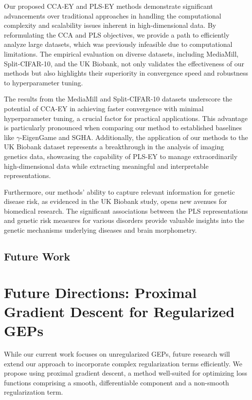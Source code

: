 Our proposed CCA-EY and PLS-EY methods demonstrate significant advancements over traditional approaches in handling the computational complexity and scalability issues inherent in high-dimensional data.
By reformulating the CCA and PLS objectives, we provide a path to efficiently analyze large datasets, which was previously infeasible due to computational limitations.
The empirical evaluation on diverse datasets, including MediaMill, Split-CIFAR-10, and the UK Biobank, not only validates the effectiveness of our methods but also highlights their superiority in convergence speed and robustness to hyperparameter tuning.

The results from the MediaMill and Split-CIFAR-10 datasets underscore the potential of CCA-EY in achieving faster convergence with minimal hyperparameter tuning, a crucial factor for practical applications.
This advantage is particularly pronounced when comparing our method to established baselines like $\gamma$-EigenGame and SGHA. Additionally, the application of our methods to the UK Biobank dataset represents a breakthrough in the analysis of imaging genetics data, showcasing the capability of PLS-EY to manage extraordinarily high-dimensional data while extracting meaningful and interpretable representations.

Furthermore, our methods' ability to capture relevant information for genetic disease risk, as evidenced in the UK Biobank study, opens new avenues for biomedical research.
The significant associations between the PLS representations and genetic risk measures for various disorders provide valuable insights into the genetic mechanisms underlying diseases and brain morphometry.

\subsection{Future Work}

\section{Future Directions: Proximal Gradient Descent for Regularized GEPs}

While our current work focuses on unregularized GEPs, future research will extend our approach to incorporate complex regularization terms efficiently. We propose using proximal gradient descent, a method well-suited for optimizing loss functions comprising a smooth, differentiable component and a non-smooth regularization term.

